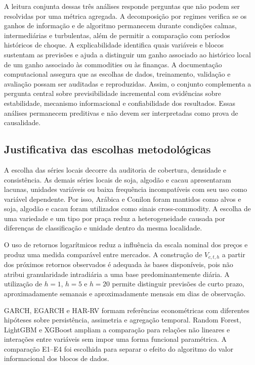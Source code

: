 \documentclass[a4paper,fleqn]{cas-sc}
\begin{document}
A leitura conjunta dessas três análises responde perguntas que não podem ser resolvidas por uma métrica agregada. A decomposição por regimes verifica se os ganhos de informação e de algoritmo permanecem durante condições calmas, intermediárias e turbulentas, além de permitir a comparação com períodos históricos de choque. A explicabilidade identifica quais variáveis e blocos sustentam as previsões e ajuda a distinguir um ganho associado ao histórico local de um ganho associado às commodities ou às finanças. A documentação computacional assegura que as escolhas de dados, treinamento, validação e avaliação possam ser auditadas e reproduzidas. Assim, o conjunto complementa a pergunta central sobre previsibilidade incremental com evidências sobre estabilidade, mecanismo informacional e confiabilidade dos resultados. Essas análises permanecem preditivas e não devem ser interpretadas como prova de causalidade.

\subsection{Justificativa das escolhas metodológicas}
\label{subsec:methodological_rationale}

A escolha das séries locais decorre da auditoria de cobertura, densidade e consistência. As demais séries locais de soja, algodão e cacau apresentaram lacunas, unidades variáveis ou baixa frequência incompatíveis com seu uso como variável dependente. Por isso, Arábica e Conilon foram mantidos como alvos e soja, algodão e cacau foram utilizados como sinais cross-commodity. A escolha de uma variedade e um tipo por praça reduz a heterogeneidade causada por diferenças de classificação e unidade dentro da mesma localidade.

O uso de retornos logarítmicos reduz a influência da escala nominal dos preços e produz uma medida comparável entre mercados. A construção de \(V_{c,t,h}\) a partir dos próximos retornos observados é adequada às bases disponíveis, pois não atribui granularidade intradiária a uma base predominantemente diária. A utilização de \(h=1\), \(h=5\) e \(h=20\) permite distinguir previsões de curto prazo, aproximadamente semanais e aproximadamente mensais em dias de observação.

GARCH, EGARCH e HAR-RV formam referências econométricas com diferentes hipóteses sobre persistência, assimetria e agregação temporal. Random Forest, LightGBM e XGBoost ampliam a comparação para relações não lineares e interações entre variáveis sem impor uma forma funcional paramétrica. A comparação E1--E4 foi escolhida para separar o efeito do algoritmo do valor informacional dos blocos de dados.
\end{document}
